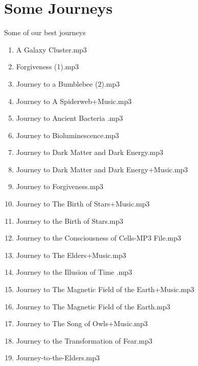 \documentclass[12pt]{book}
\begin{document}
\appendix

\chapter{Some Journeys}
\label{sec:journeys}

Some of our best journeys
\begin{enumerate}
\item A Galaxy Cluster.mp3
\item Forgiveness (1).mp3
\item Journey to a Bumblebee (2).mp3
\item Journey to A Spiderweb+Music.mp3
\item Journey to Ancient Bacteria .mp3
\item Journey to Bioluminescence.mp3
\item Journey to Dark Matter and Dark Energy.mp3
\item Journey to Dark Matter and Dark Energy+Music.mp3
\item Journey to Forgiveness.mp3
\item Journey to The Birth of Stars+Music.mp3
\item Journey to the Birth of Stars.mp3
\item Journey to the Consciousness of Cells-MP3 File.mp3
\item Journey to The Elders+Music.mp3
\item Journey to the Illusion of Time .mp3
\item Journey to The Magnetic Field of the Earth+Music.mp3
\item Journey to The Magnetic Field of the Earth.mp3
\item Journey to The Song of Owls+Music.mp3
\item Journey to the Transformation of Fear.mp3
\item Journey-to-the-Elders.mp3
\end{enumerate}
\end{document}
